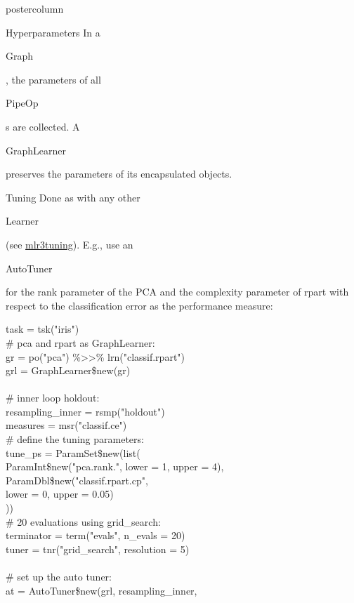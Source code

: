 \documentclass{beamer}
\newcommand{\codeinline}[1]{\begin{codeboxinline}#1\end{codeboxinline}}
\begin{document}
\begin{frame}[fragile]{}
\begin{columns}
\begin{column}{.245\textwidth}
\begin{beamercolorbox}[center]{postercolumn}
\begin{minipage}{.98\textwidth}
{\begin{myblock}{Hyperparameters}
              In a \codeinline{Graph}, the parameters of all \codeinline{PipeOp}s are collected. A \codeinline{GraphLearner} preserves the parameters of its encapsulated objects.
            \end{myblock}
            \begin{myblock}{Tuning}
              Done as with any other \codeinline{Learner} (see \href{FIXME:CheatsheetLink}{mlr3tuning}). E.g., use an \codeinline{AutoTuner} for the rank parameter of the PCA and the complexity parameter of rpart with respect to the classification error as the performance measure:
              \begin{codeboxexample}
						  {\footnotesize
                task = tsk("iris")\\
                \# pca and rpart as GraphLearner:\\
                gr = po("pca") \%>{}>\% lrn("classif.rpart")\\
                grl = GraphLearner\$new(gr)\\
                \ \\
                \# inner loop holdout:\\
                resampling\_inner = rsmp("holdout")\\
                measures = msr("classif.ce")\\
                \# define the tuning parameters:\\
                tune\_ps = ParamSet\$new(list(\\
                \hspace*{1ex} ParamInt\$new("pca.rank.", lower = 1, upper = 4),\\
                \hspace*{1ex} ParamDbl\$new("classif.rpart.cp",\\
                \hspace*{2ex} lower = 0, upper = 0.05)\\
                ))\\
                \# 20 evaluations using grid\_search:\\
                terminator = term("evals", n\_evals = 20)\\
                tuner = tnr("grid\_search", resolution = 5)\\
                \ \\
                \# set up the auto tuner:\\
                at = AutoTuner\$new(grl, resampling\_inner,\\
}
\end{codeboxexample}
\end{myblock}}
\end{minipage}
\end{beamercolorbox}
\end{column}
\end{columns}
\end{frame}
\end{document}
